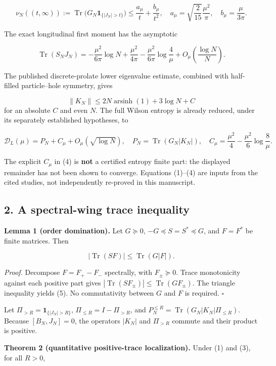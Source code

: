 \documentclass[
  10pt,
  a4paper,
]{article}
\begin{document}
\[
\nu_N((t,\infty)):=\operatorname{Tr}\!\bigl(G_N\mathbf1_{\{|J_N|>t\}}\bigr)
\le\frac{a_\mu}{t}+\frac{b_\mu}{t^2},\quad
 a_\mu=\sqrt{\frac2{15}}\frac{\mu^2}{\pi},\quad b_\mu=\frac\mu{3\pi}.
\tag{1}
\]

The exact longitudinal first moment has the asymptotic

\[
\operatorname{Tr}(S_NJ_N)=-\frac{\mu^2}{6\pi}\log N+
\frac{\mu^2}{4\pi}-\frac{\mu^2}{6\pi}\log\frac4\mu
+O_\mu\!\left(\frac{\log N}{N}\right).
\tag{2}
\]

The published discrete-prolate lower eigenvalue estimate, combined with half-filled particle--hole symmetry, gives

\[
\|K_N\|\le 2N\operatorname{arsinh}(1)+3\log N+C
\tag{3}
\] for an absolute \(C\) and even \(N\). The full Wilson entropy is already reduced, under its separately established hypotheses, to

\[
\mathcal D_L(\mu)=P_N+C_\mu+O_\mu(\sqrt{\log N}),\quad
P_N=\operatorname{Tr}(G_N|K_N|),\quad
C_\mu=\frac{\mu^2}{4}-\frac{\mu^2}{6}\log\frac8\mu.
\tag{4}
\]

The explicit \(C_\mu\) in (4) is \textbf{not} a certified entropy finite part: the displayed remainder has not been shown to converge. Equations (1)--(4) are inputs from the cited studies, not independently re-proved in this manuscript.

\subsection{2. A spectral-wing trace inequality}\label{a-spectral-wing-trace-inequality}

\textbf{Lemma 1 (order domination).} Let \(G\succeq0\), \(-G\preceq S=S^*\preceq G\), and \(F=F^*\) be finite matrices. Then

\[
\boxed{\bigl|\operatorname{Tr}(SF)\bigr|\le\operatorname{Tr}(G|F|).}
\tag{5}
\]

\emph{Proof.} Decompose \(F=F_+-F_-\) spectrally, with \(F_\pm\succeq0\). Trace monotonicity against each positive part gives \(|\operatorname{Tr}(SF_\pm)|\le\operatorname{Tr}(GF_\pm)\). The triangle inequality yields (5). No commutativity between \(G\) and \(F\) is required. \(\square\)

Let \(\Pi_{>R}=\mathbf1_{\{|J_N|>R\}}\), \(\Pi_{\le R}=I-\Pi_{>R}\), and \(P_N^{\le R}=\operatorname{Tr}(G_N|K_N|\Pi_{\le R})\). Because \([B_N,J_N]=0\), the operators \(|K_N|\) and \(\Pi_{>R}\) commute and their product is positive.

\textbf{Theorem 2 (quantitative positive-trace localization).} Under (1) and (3), for all \(R>0\),
\end{document}
